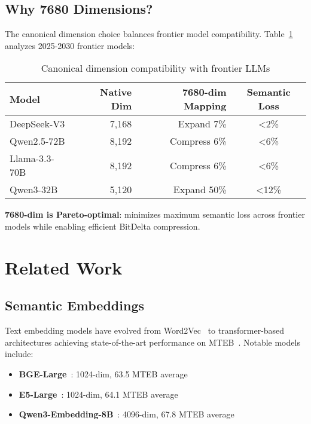\documentclass[11pt,a4paper]{article}
\begin{document}
\subsection{Why 7680 Dimensions?}

The canonical dimension choice balances frontier model compatibility. Table~\ref{tab:dimension-choice} analyzes 2025-2030 frontier models:

\begin{table}[h]
\centering
\caption{Canonical dimension compatibility with frontier LLMs}
\label{tab:dimension-choice}
\begin{tabular}{lrrc}
\toprule
\textbf{Model} & \textbf{Native Dim} & \textbf{7680-dim Mapping} & \textbf{Semantic Loss} \\
\midrule
DeepSeek-V3 & 7,168 & Expand 7\% & <2\% \\
Qwen2.5-72B & 8,192 & Compress 6\% & <6\% \\
Llama-3.3-70B & 8,192 & Compress 6\% & <6\% \\
Qwen3-32B & 5,120 & Expand 50\% & <12\% \\
\bottomrule
\end{tabular}
\end{table}

\textbf{7680-dim is Pareto-optimal}: minimizes maximum semantic loss across frontier models while enabling efficient BitDelta compression.

\section{Related Work}

\subsection{Semantic Embeddings}

Text embedding models have evolved from Word2Vec~\cite{mikolov2013word2vec} to transformer-based architectures achieving state-of-the-art performance on MTEB~\cite{muennighoff2023mteb}. Notable models include:

\begin{itemize}
\item \textbf{BGE-Large}~\cite{xiao2024bge}: 1024-dim, 63.5 MTEB average
\item \textbf{E5-Large}~\cite{wang2024e5}: 1024-dim, 64.1 MTEB average
\item \textbf{Qwen3-Embedding-8B}~\cite{qwen2024embedding}: 4096-dim, 67.8 MTEB average
\end{itemize}
\end{document}
